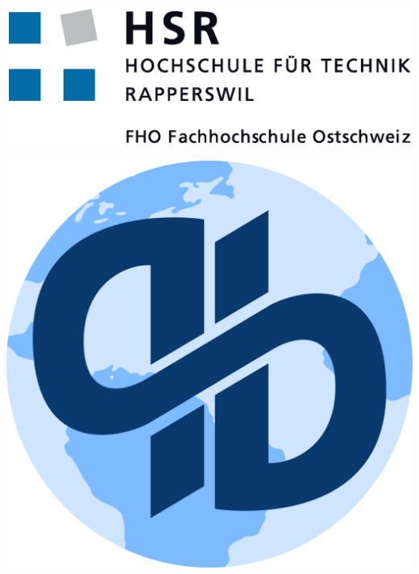 \documentclass[a4paper,parskip=full]{scrreprt}
\begin{document}

\begin{titlepage}

\begin{flushleft}

\noindent\begin{minipage}[t]{0.49\textwidth}
	\begin{flushleft}
		\vspace{3pt} %
		\includegraphics[height=0.12\textheight]{img/hsr.eps}
	\end{flushleft}
\end{minipage}
\hfill
\begin{minipage}[t]{0.49\textwidth}
	\begin{flushright}
		\vspace{0pt} %
		\includegraphics[height=0.15\textheight]{img/qutebrowser.png}
	\end{flushright}
\end{minipage}
\\[4cm]


\end{flushleft}
\end{titlepage}
\end{document}
